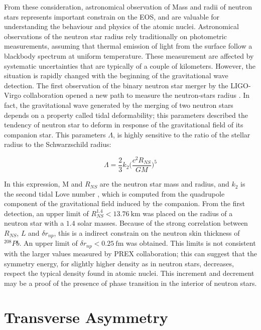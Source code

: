 From these consideration, astronomical observation of Mass and radii of neutron stars represents important constrain on the EOS, and are valuable for understanding the behaviour and physics of the atomic nuclei.
Astronomical observations of the neutron star radius rely traditionally on photometric measurements, assuming that thermal emission of light from the surface follow a blackbody spectrum at uniform temperature. These measurement are affected by systematic uncertainties that are typically of a couple of kilometers.
However, the situation is rapidly changed with the beginning of the gravitational wave detection. The first observation of the binary neutron star merger by the LIGO-Virgo collaboration opened a new path to measure the neutron-stars radius \cite{LIGOScientific:2017vwq}. In fact, the gravitational wave generated by the merging of two neutron stars depends on a property called tidal deformability; this parameters described the tendency of neutron star to deform in response of the gravitational field of its companion star. This parameters $\Lambda$, is highly sensitive to the ratio of the stellar radius to the Schwarzschild radius:

\begin{equation}
\Lambda = \frac{2}{3} k_{2} \big( \dfrac{c^{2} R_{NS}}{GM} \big)^{5}
\end{equation}

In this expression, M and $R_{NS}$ are the neutron star mass and radius, and $k_{2}$ is the second tidal Love number \cite{Binnington:2009bb}, which is computed from the quadrupole component of the gravitational field induced by the companion. From the first detection, an upper limit of $R_{NS}^{1.4} < \SI{13.76}{\kilo \meter}$ was placed on the radius of a neutron star with a $1.4$ solar masses. Because of the strong correlation between $R_{NS}$, $L$ and $\delta r_{np}$, this is a indirect constrain on the neutron skin thickness of $^{208}Pb$. An upper limit of $\delta r_{np} < \SI{0.25}{\femto \meter}$ was obtained. This limits is not consistent with the larger values measured by PREX collaboration; this can suggest that the symmetry energy, for slightly higher density as in neutron stars, decreases, respect the typical density found in atomic nuclei. This increment and decrement may be a proof of the presence of phase transition in the interior of neutron stars.


\section{Transverse Asymmetry}

